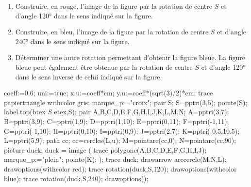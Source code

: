 \begin{corrige}
    \begin{enumerate}
        \item Construire, en rouge, l'image de la figure par la rotation de centre $S$ et d'angle \ang{120} dans le sens indiqué sur la figure.
        \item Construire, en bleu, l'image de la figure par la rotation de centre $S$ et d'angle \ang{240} dans le sens indiqué sur la figure.
    \end{enumerate}
    \Coupe
    \begin{enumerate}
        \setcounter{enumi}{2}
        \item Déterminer une autre rotation permettant d'obtenir la figure bleue.
        {\red La figure bleue peut également être obtenue par la rotation de centre $S$ et d'angle \ang{120} dans le sens inverse de celui indiqué sur la figure.}
    \end{enumerate}
    \begin{Geometrie}[CoinHD={(7u,6u)}]
        coeff:=0.6;
        uni:=true;
        x.u:=coeff*cm;
        y.u:=coeff*(sqrt(3)/2)*cm;
        trace papiertriangle withcolor gris;
        marque_p:="croix";
        pair S;
        S=pptri(3,5);    
        pointe(S);
        label.top(btex $S$ etex,S);
        pair A,B,C,D,E,F,G,H,I,J,K,L,M,N;
        A=pptri(3,7);
        B=pptri(3,9);
        C=pptri(1,9);
        D=pptri(1,10);
        E=pptri(0,11);
        F=pptri(-1,11);
        G=pptri(-1,10);
        H=pptri(0,10);
        I=pptri(0,9);
        J=pptri(2,7);
        K=pptri(-0.5,10.5);
        L=pptri(5,9);
        path cc;
        cc=cercles(L,u);
        M=pointarc(cc,0);
        N=pointarc(cc,90);
        picture duck;
        duck = image ( 
            trace polygone(A,B,C,D,E,F,G,H,I,J);         
            marque_p:="plein";
            pointe(K);
        );
        trace duck;
        drawarrow arccercle(M,N,L);
        drawoptions(withcolor red);
        trace rotation(duck,S,120);
        drawoptions(withcolor blue);
        trace rotation(duck,S,240);
        drawoptions();      
    \end{Geometrie}
\end{corrige}

